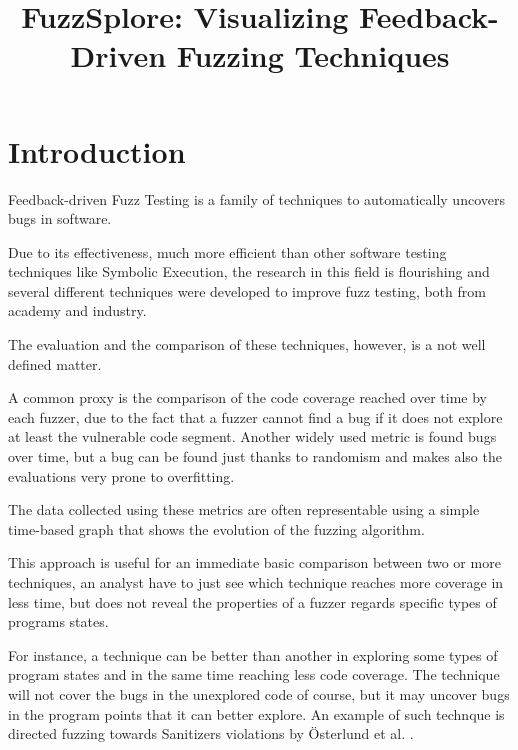 \documentclass[conference,compsoc]{IEEEtran}
\begin{document}
\title{FuzzSplore: Visualizing Feedback-Driven Fuzzing Techniques}

\author{
\and
{}
}

\maketitle

\section{Introduction}

Feedback-driven Fuzz Testing is a family of techniques to automatically uncovers bugs in software.

Due to its effectiveness, much more efficient than other software testing techniques like Symbolic Execution, the research in this field is flourishing and several different techniques were developed to improve fuzz testing, both from academy and industry.

The evaluation and the comparison of these techniques, however, is a not well defined matter.

A common proxy is the comparison of the code coverage reached over time by each fuzzer, due to the fact that a fuzzer cannot find a bug if it does not explore at least the vulnerable code segment.
Another widely used metric is found bugs over time, but a bug can be found just thanks to randomism and makes also the evaluations very prone to overfitting.

The data collected using these metrics are often representable using a simple time-based graph that shows the evolution of the fuzzing algorithm.

This approach is useful for an immediate basic comparison between two or more techniques, an analyst have to just see which technique reaches more coverage in less time, but does not reveal the properties of a fuzzer regards specific types of programs states.

For instance, a technique can be better than another in exploring some types of program states and in the same time reaching less code coverage.
The technique will not cover the bugs in the unexplored code of course, but it may uncover bugs in the program points that it can better explore.
An example of such technque is directed fuzzing towards Sanitizers violations by \"Osterlund et al. \cite{parmesan}.
\end{document}
